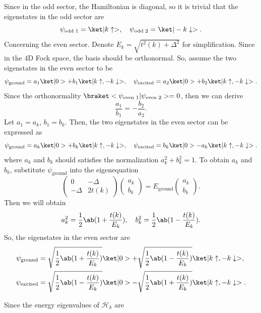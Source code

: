 \begin{solution}
\begin{enumext}
\[    \]
    \item Since in the odd sector, the Hamiltonian is diagonal, so it is trivial
    that the eigenstates in the odd sector are
    \[
      \psi_\text{odd 1} = \ket|k\uparrow>, \quad
      \psi_\text{odd 2} = \ket|-k\downarrow>.
    \]
    Concerning the even sector. Denote $E_k = \sqrt{t^2(k) + \Delta^2}$ for
    simplification. Since in the 4D Fock space, the basis should be orthonormal.
    So, assume the two eigenstates in the even sector to be
    \[
      \psi_\text{ground} = a_1\ket|0> + b_1\ket|k\uparrow, -k\downarrow>, \quad
      \psi_\text{excited} = a_2\ket|0> + b_2\ket|k\uparrow, -k\downarrow>.
    \]
    Since the orthonormality
    $\braket<\psi_\text{even 1}|\psi_\text{even 2}> = 0$, then we can derive
    \[
      \frac{a_1}{b_1} = -\frac{b_2}{a_2}.
    \]
    Let $a_1 = a_k$, $b_1 = b_k$. Then, the two eigenstates in the even sector
    can be expressed as
    \[
      \psi_\text{ground}  = a_k\ket|0> + b_k\ket|k\uparrow, -k\downarrow>, \quad
      \psi_\text{excited} = b_k\ket|0> - a_k\ket|k\uparrow, -k\downarrow>.
    \]
    where $a_k$ and $b_k$ should satisfies the normalization
    $a_k^2 + b_k^2 = 1$.
    To obtain $a_k$ and $b_k$, substitute $\psi_\text{ground}$ into the
    eigenequation
    \[
      \begin{pmatrix}
        0 & -\Delta\\ -\Delta & 2t(k)
      \end{pmatrix}
      \begin{pmatrix}
        a_k \\ b_k
      \end{pmatrix} =
      E_\text{ground}
      \begin{pmatrix}
        a_k \\ b_k
      \end{pmatrix}.
    \]
    Then we will obtain
    \[
      a_k^2 = \frac12\ab(1 + \frac{t(k)}{E_k}), \quad
      b_k^2 = \frac12\ab(1 - \frac{t(k)}{E_k}).
    \]
    So, the eigenstates in the even sector are
    \begin{align*}
      \psi_\text{ground} &
    = \sqrt{\frac12\ab(1 + \frac{t(k)}{E_k})} \ket|0>
    + \sqrt{\frac12\ab(1 - \frac{t(k)}{E_k})} \ket|k\uparrow, -k\downarrow>,\\
      \psi_\text{excited}&
    = \sqrt{\frac12\ab(1 - \frac{t(k)}{E_k})} \ket|0>
    - \sqrt{\frac12\ab(1 + \frac{t(k)}{E_k})} \ket|k\uparrow, -k\downarrow>.
    \end{align*}
    \item Since the energy eigenvalues of $\mathcal H_k$ are

\end{enumext}
\end{solution}
